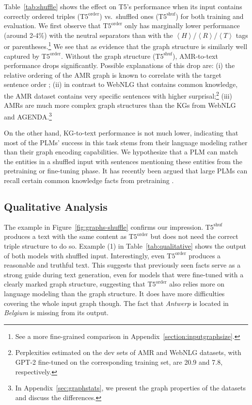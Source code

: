\documentclass[11pt]{article}
\newcommand{\ourtag}[1]{\ensuremath{\left\langle #1 \right\rangle}}
\newcommand{\shufmodel}[3]{\ensuremath{\text{#1}^{\text{#3}}}}
\begin{document}
\begin{table}[t]
Table~\ref{tab:shuffle} shows the effect on T5's performance when its input contains correctly ordered triples (\shufmodel{T5}{small}{order}) vs.\ shuffled ones (\shufmodel{T5}{small}{shuf}) for both training and evaluation.
We first observe that \shufmodel{T5}{small}{order} only has marginally lower performance (around 2-4\%{}) with the neutral separators than with the \ourtag{H}/\ourtag{R}/\ourtag{T} tags or parentheses.\footnote{See a more fine-grained comparison in Appendix~\ref{section:inputgraphsize}.} We see that as evidence that the graph structure is similarly well captured by \shufmodel{T5}{small}{order}.
Without the graph structure (\shufmodel{T5}{small}{shuf}), AMR-to-text performance drops significantly. Possible explanations of this drop are: (i) the relative ordering of the AMR graph is known to correlate with the target sentence order \cite{konsas_17}; (ii) in contrast to WebNLG that contains common knowledge, the AMR dataset contains very specific sentences with higher surprisal;\footnote{Perplexities estimated on the dev sets of AMR and WebNLG datasets, with GPT-2 fine-tuned on the corresponding training set, are 20.9 and 7.8, respectively.} (iii) AMRs are much more complex graph structures than the KGs from WebNLG and AGENDA.\footnote{In Appendix~\ref{sec:graphstats}, we present the graph properties of the datasets and discuss the differences.}  

On the other hand, KG-to-text performance is not much lower,
indicating that most of the PLMs' success in this task stems from their language modeling rather than their graph encoding capabilities. 
We hypothesize that a PLM can match the entities in a shuffled input with sentences mentioning these entities from the pretraining or fine-tuning phase.
It has recently been argued that large PLMs can recall certain common knowledge facts from pretraining \citep{petroni-etal-2019-language,bosselut-etal-2019-comet}.







\subsection{Qualitative Analysis}
\label{sec:qualitative}

The example in Figure~\ref{fig:graphs-shuffle} confirms our impression.
\shufmodel{T5}{small}{shuf} produces a text with the same content as \shufmodel{T5}{small}{order} but does not need the correct triple structure to do so.
Example (1) in Table~\ref{tab:qualitative} shows the output of both models with shuffled input.
Interestingly, even \shufmodel{T5}{small}{order} produces a reasonable and truthful text.
This suggests that previously seen facts serve as a strong guide during text generation, even for models that were fine-tuned with a clearly marked graph structure,
suggesting that \shufmodel{T5}{small}{order} also relies more on language modeling than the graph structure.
It does have more difficulties covering the whole input graph though.
The fact that \emph{Antwerp} is located in \emph{Belgium} is missing from its output.


\end{table}
\end{document}
